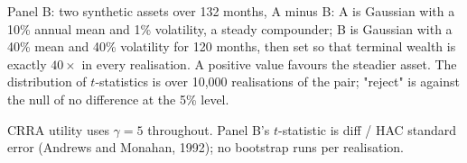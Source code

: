 \begin{table}[htbp]
\begin{threeparttable}
\begin{tablenotes}[flushleft]
\item Panel B: two synthetic assets over 132 months, A minus B: A is Gaussian with a 10\% annual mean and 1\% volatility, a steady compounder; B is Gaussian with a 40\% mean and 40\% volatility for 120 months, then set so that terminal wealth is exactly $40\times$ in every realisation. A positive value favours the steadier asset. The distribution of $t$-statistics is over 10,000 realisations of the pair; "reject" is against the null of no difference at the 5\% level.
\item CRRA utility uses $\gamma=5$ throughout. Panel B's $t$-statistic is diff / HAC standard error (Andrews and Monahan, 1992); no bootstrap runs per realisation.
\end{tablenotes}
\end{threeparttable}
\end{table}
